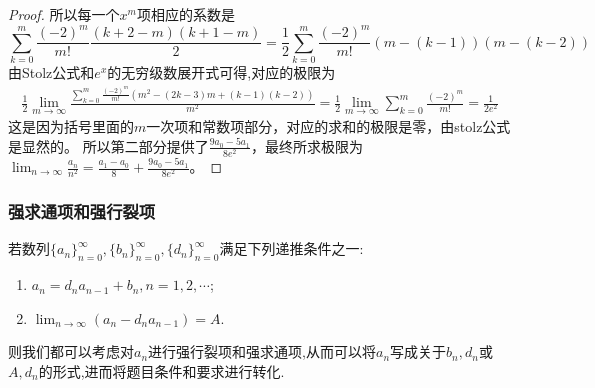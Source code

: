 \documentclass[../../main.tex]{subfiles}
\begin{document}
\begin{proof}
所以每一个\(x^m\)项相应的系数是
\[
\sum_{k = 0}^{m}\frac{(-2)^m}{m!}\frac{(k + 2 - m)(k + 1 - m)}{2}=\frac{1}{2}\sum_{k = 0}^{m}\frac{(-2)^m}{m!}(m - (k - 1))(m - (k - 2))
\]
由Stolz公式和$e^x$的无穷级数展开式可得,对应的极限为
\begin{align*}
\frac{1}{2}\lim_{m\rightarrow\infty}\frac{\sum\limits_{k = 0}^{m}\frac{(-2)^m}{m!}(m^2-(2k - 3)m+(k - 1)(k - 2))}{m^2}
=\frac{1}{2}\lim_{m\rightarrow\infty}\sum_{k = 0}^{m}\frac{(-2)^m}{m!}=\frac{1}{2e^2}
\end{align*}
这是因为括号里面的\(m\)一次项和常数项部分，对应的求和的极限是零，由stolz公式是显然的。
所以第二部分提供了\(\frac{9a_0 - 5a_1}{8e^2}\)，最终所求极限为\(\lim_{n\rightarrow\infty}\frac{a_n}{n^2}=\frac{a_1 - a_0}{8}+\frac{9a_0 - 5a_1}{8e^2}\)。
\end{proof}





\subsubsection{强求通项和强行裂项}

若数列\(\{ a_n \}_{n = 0}^{\infty}, \{ b_n \}_{n = 0}^{\infty}, \{ d_n \}_{n = 0}^{\infty}\)满足下列递推条件之一:
\begin{enumerate}
\item \(a_n = d_na_{n - 1} + b_n, n = 1, 2, \cdots\);
\item \(\lim_{n\rightarrow \infty}(a_n - d_na_{n - 1}) = A\).
\end{enumerate}
则我们都可以考虑对\(a_n\)进行强行裂项和强求通项,从而可以将\(a_n\)写成关于\(b_n, d_n\)或\(A, d_n\)的形式,进而将题目条件和要求进行转化.
\end{document}
